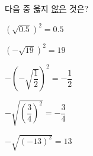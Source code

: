 다음 중 옳지 \underline{않은} 것은?
\begin{choices32}{\rule[-3ex]{0pt}{8ex}$(\sqrt{0.5})^2=0.5$}{\rule[-3ex]{0pt}{8ex}$(-\sqrt{19})^2=19$}{\rule[-3ex]{0pt}{8ex}$-\left(-\sqrt{\dfrac{1}{2}}\right)^2=-\dfrac{1}{2}$}{\rule[-3ex]{0pt}{8ex}$-\sqrt{\left(\dfrac{3}{4}\right)^2}=-\dfrac{3}{4}$}{\rule[-3ex]{0pt}{8ex}$-\sqrt{(-13)^2}=13$}\end{choices32}
